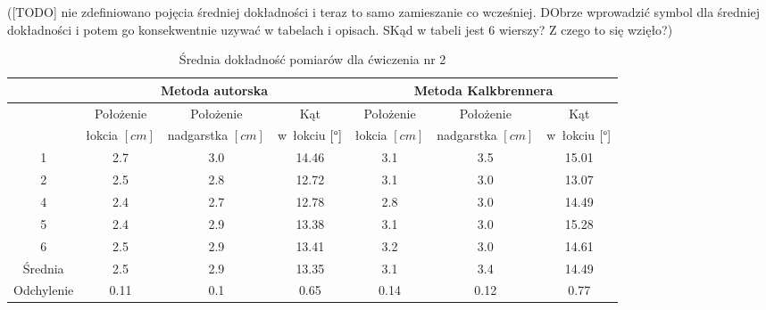 ([TODO] nie zdefiniowano pojęcia średniej dokładności i teraz to samo zamieszanie co wcześniej. DObrze wprowadzić symbol dla średniej dokładności i potem go konsekwentnie uzywać w tabelach i opisach. SKąd w tabeli jest 6 wierszy? Z czego to się wzięło?)

\begin{table}[!htp]
	\caption{Średnia dokładność pomiarów dla ćwiczenia nr 2}
	\label{tab:experiments:sec:avg}
	\noindent
	\tiny
	\centering
	\begin{tabular}{|c|c|c|c|c|c|c|}
		\hline 
		& \multicolumn{3}{c|}{Metoda autorska} & \multicolumn{3}{c|}{Metoda Kalkbrennera}  \\ 
		\hline 
		           & Położenie    & Położenie       & Kąt                  & Położenie    & Położenie       & Kąt                  \\
		           & łokcia $[cm]$ & nadgarstka $[cm]$ & w~łokciu	$[\degree]$ & łokcia $[cm]$ & nadgarstka $[cm]$ & w~łokciu	$[\degree]$ \\
		\hline
		1          & 2.7            & 3.0               & 14.46                 & 3.1            & 3.5               & 15.01                 \\
		2          & 2.5            & 2.8               & 12.72                 & 3.1            & 3.0               & 13.07                 \\
		4          & 2.4            & 2.7               & 12.78                 & 2.8            & 3.0               & 14.49                 \\
		5          & 2.4            & 2.9               & 13.38                 & 3.1            & 3.0               & 15.28                 \\
		6          & 2.5            & 2.9               & 13.41                 & 3.2            & 3.0               & 14.61                 \\
		\hline
		Średnia   & 2.5            & 2.9               & 13.35                 & 3.1            & 3.4               & 14.49                 \\
		Odchylenie & 0.11           & 0.1               & 0.65                  & 0.14           & 0.12              & 0.77                  \\
		\hline
	\end{tabular} 
	
\end{table} 

